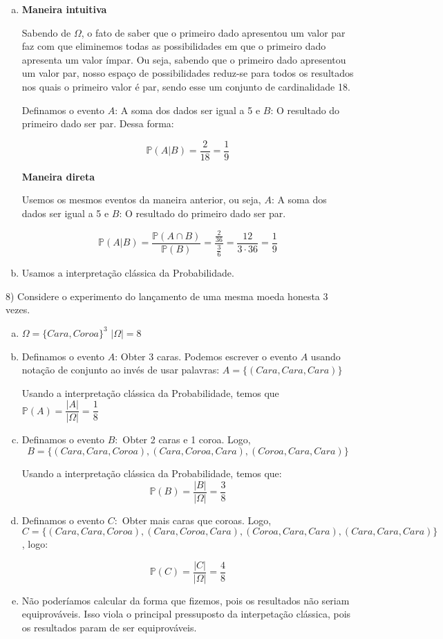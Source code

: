\documentclass[12pt]{article}
\begin{document}
\begin{enumerate}[a)]
    \item 
    
    \textbf{Maneira intuitiva}

    Sabendo de $\Omega$, o fato de saber que o primeiro dado apresentou um valor par faz com que eliminemos todas as possibilidades em que o primeiro dado apresenta um valor ímpar. 
    Ou seja, sabendo que o primeiro dado apresentou um valor par, nosso espaço de possibilidades reduz-se para todos os resultados nos quais o primeiro valor é par, sendo 
    esse um conjunto de cardinalidade 18. 

    Definamos o evento $A$: A soma dos dados ser igual a 5 e $B$: O resultado do primeiro dado ser par.  Dessa forma:

    $$\mathds{P}(A|B) = \dfrac{2}{18} = \dfrac{1}{9}$$

    \textbf{Maneira direta}

    Usemos os mesmos eventos da maneira anterior, ou seja,  $A$: A soma dos dados ser igual a 5 e $B$: O resultado do primeiro dado ser par.

    $$\mathds{P}(A|B) = \dfrac{\mathds{P}(A \cap B)}{\mathds{P}(B)} = \dfrac{\frac{2}{36}}{\frac{3}{6}} = \dfrac{12}{3 \cdot 36} = \dfrac{1}{9}$$

    \item Usamos a interpretação clássica da Probabilidade. 
\end{enumerate}

\vspace{5px}

8) Considere o experimento do lançamento de uma mesma moeda honesta 3 vezes.  

\begin{enumerate}[a)]
    \item $\Omega = \{Cara, Coroa\}^3$ $|\Omega| = 8$
    \item Definamos o evento $A$: Obter 3 caras. Podemos escrever o evento $A$ usando notação de conjunto ao invés de usar palavras: $A=\{(Cara, Cara, Cara)\}$
    
    Usando a interpretação clássica da Probabilidade, temos que $\mathds{P}(A) = \dfrac{|A|}{|\Omega|} = \dfrac{1}{8}$
    \item
    Definamos o evento $B:$ Obter 2 caras e 1 coroa. Logo, $$B=\{(Cara, Cara, Coroa), (Cara, Coroa, Cara), (Coroa, Cara, Cara)\}$$

    Usando a interpretação clássica da Probabilidade, temos que:
    $$\mathds{P}(B) = \dfrac{|B|}{|\Omega|} = \dfrac{3}{8}$$
    \item Definamos o evento $C:$ Obter mais caras que coroas. Logo, $$C=\{(Cara, Cara, Coroa), (Cara, Coroa, Cara), (Coroa, Cara, Cara), (Cara, Cara, Cara)\}$$, logo:
    
    $$\mathds{P}(C) =  \dfrac{|C|}{|\Omega|} = \dfrac{4}{8}$$
    \item Não poderíamos calcular da forma que fizemos, pois os resultados não seriam equiprováveis. Isso viola o principal pressuposto da interpetação clássica, pois os resultados param de ser equiprováveis. 
\end{enumerate}
\end{document}
